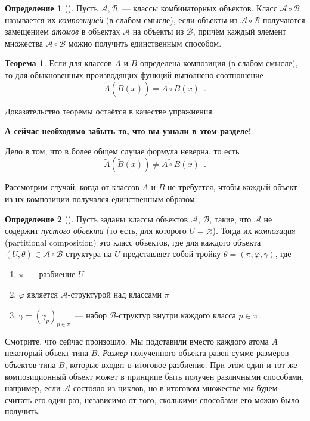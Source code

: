 \documentclass[a5paper]{article}
\theoremstyle{definition}
\newtheorem*{theorem}{Теорема}
\newtheorem*{definition}{Определение}
\begin{document}
\begin{definition}[{\cite[Определение 2.2.20, с.49]{gouldenjackson}}]
	Пусть \( \mathcal A, \mathcal B \)~--- классы комбинаторных объектов. Класс 
	\( \mathcal A \circ \mathcal B \) называется их \textit{композицией}
(в слабом смысле), если 
	объекты из \( \mathcal A \circ \mathcal B \) получаются замещением 
	\textit{атомов} в объектах \( \mathcal A \) на объекты из \( \mathcal B \), 
	причём каждый элемент множества \( \mathcal A \circ \mathcal B \) можно 
	получить единственным способом.
\end{definition}
\begin{theorem}
    Если для классов \( A \) и \( B \) определена композиция (в слабом смысле),
то для обыкновенных производящих функций выполнено соотношение
\[
    \widetilde A( \widetilde B(x)) = \widetilde{A \circ B}(x) \enspace .
\]    
\end{theorem}
Доказательство теоремы остаётся в качестве упражнения.

\textbf{А сейчас необходимо забыть то, что вы узнали в этом разделе!}

Дело в том, что в более общем случае формула неверна, то есть 
\[
    \widetilde A( \widetilde B(x)) \neq \widetilde{A \circ B}(x) \enspace .
\]    

Рассмотрим случай, когда от классов \( A \) и \( B \) не требуется, чтобы каждый
объект из их композиции получался единственным образом.
\begin{definition}[{\cite[p.43]{species}}]
	Пусть заданы классы объектов \( \mathcal A \), \( \mathcal B \), такие, что 
	\( \mathcal A \) не содержит \textit{пустого объекта} (то есть, для 
	которого 
	\( U = \varnothing \)). 
	 Тогда их \textit{композиция} (partitional composition) это класс объектов, 
	 где для каждого объекта \( (U, \theta) \in \mathcal A \circ \mathcal B \) 
	 структура на \( U \) представляет собой тройку \( \theta = (\pi, \varphi, \gamma) \), где
	\begin{enumerate}
		\item \( \pi \)~--- разбиение \( U \)
		\item \( \varphi \) является \( \mathcal A \)-структурой над классами 
		\( \pi \)
		\item \( \gamma = (\gamma_p)_{p \in \pi} \)~--- набор \( 
		\mathcal B \)-структур внутри каждого класса \( p \in \pi \).
	\end{enumerate}
\end{definition}
Смотрите, что сейчас произошло. Мы подставили вместо каждого атома \( A \)
некоторый объект типа \( B \). \textit{Размер} полученного объекта равен сумме
размеров объектов типа \( B \), которые входят в итоговое разбиение. При этом
один и тот же композиционный объект может в принципе быть получен различными
способами, например, если \(\mathcal A\) состояло из циклов, но в итоговом множестве мы будем считать его один раз, независимо от
того, сколькими способами его можно было получить.
\end{document}
